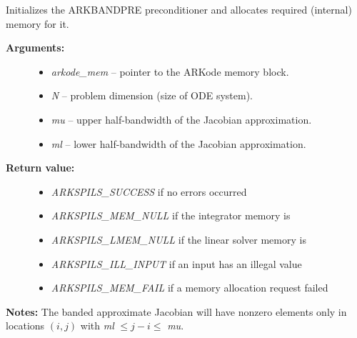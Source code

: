 \documentclass[letterpaper,10pt,english]{sphinxmanual}
\begin{document}
\begin{fulllineitems}
\label{c_interface/Preconditioners:c.ARKBandPrecInit}
Initializes the ARKBANDPRE preconditioner and
allocates required (internal) memory for it.
\begin{description}
\item[{\textbf{Arguments:}}] \leavevmode\begin{itemize}
\item {} 
\emph{arkode\_mem} -- pointer to the ARKode memory block.

\item {} 
\emph{N} -- problem dimension (size of ODE system).

\item {} 
\emph{mu} -- upper half-bandwidth of the Jacobian approximation.

\item {} 
\emph{ml} -- lower half-bandwidth of the Jacobian approximation.

\end{itemize}

\item[{\textbf{Return value:}}] \leavevmode\begin{itemize}
\item {} 
\emph{ARKSPILS\_SUCCESS} if no errors occurred

\item {} 
\emph{ARKSPILS\_MEM\_NULL} if the integrator memory is 

\item {} 
\emph{ARKSPILS\_LMEM\_NULL} if the linear solver memory is 

\item {} 
\emph{ARKSPILS\_ILL\_INPUT} if an input has an illegal value

\item {} 
\emph{ARKSPILS\_MEM\_FAIL} if a memory allocation request failed

\end{itemize}

\end{description}

\textbf{Notes:} The banded approximate Jacobian will have nonzero elements
only in locations \((i,j)\) with \emph{ml} \(\le j-i \le\) \emph{mu}.

\end{fulllineitems}
\end{document}
